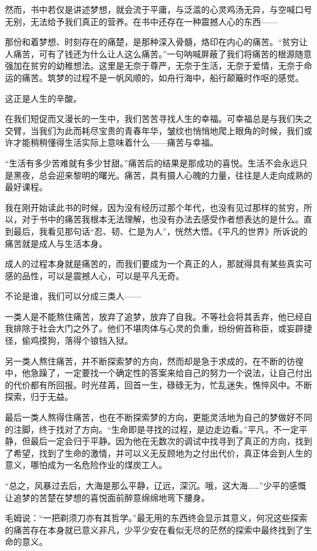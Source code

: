 \documentclass[openany,scheme = chinese, linespread = 1.5]{ctexbook}
\begin{document}
然而，书中若仅是讲述梦想，就会流于平庸，与泛滥的心灵鸡汤无异，与空喊口号无别，无法给予我们真正的营养。在书中还存在一种震撼人心的东西——    

那份和着梦想、时刻存在的痛楚，是那种深入骨髓，烙印在内心的痛苦。“贫穷让人痛苦，可有了钱还为什么让人这么痛苦。”一句呐喊屏蔽了我们将痛苦的根源随意强加在贫穷的幼稚想法。这里是无奈于尊严，无奈于生活，无奈于爱情，无奈于命运的痛苦。筑梦的过程不是一帆风顺的，如舟行海中，船行颠簸时作呕的感觉。

这正是人生的辛酸。

在我们短促而又漫长的一生中，我们苦苦寻找人生的幸福。可幸福总是与我们失之交臂，当我们为此而耗尽宝贵的青春年华，皱纹也悄悄地爬上眼角的时候，我们或许才能稍稍懂得生活实际上意味着什么——痛苦与幸福。

 “生活有多少苦难就有多少甘甜。”痛苦后的结果是那成功的喜悦。生活不会永远只是黑夜，总会迎来黎明的曙光。痛苦，具有摄人心魄的力量，往往是人走向成熟的最好课程。
 
我在刚开始读此书的时候，因为没有经历过那个年代，也没有见过那样的贫穷，所以，对于书中的痛苦我根本无法理解，也没有办法去感受作者想表达的是什么。直到最后，我看见那句话“忍、韧、仁是为人”，恍然大悟。《平凡的世界》所诉说的痛苦就是成人与生活本身。

成人的过程本身就是痛苦的，而我们要成为一个真正的人，那就得具有某些真实可感的品性，可以是震撼人心，可以是平凡无奇。

不论是谁，我们可以分成三类人——

一类人是不能熬住痛苦，放弃了追梦，放弃了自我。不等社会将其丢弃，他已经自我排除于社会大门之外了。他们不堪肉体与心灵的负重，纷纷俯首称臣，或妄辟捷径，偷鸡摸狗，落得个锒铛入狱。

另一类人熬住痛苦，并不断探索梦的方向，然而却是急于求成的，在不断的彷徨中，他急躁了，一定要找一个确定性的答案来给自己的努力一个说法，让自己付出的代价都有所回报。时光荏苒，回首一生，碌碌无为，忙乱迷失，憔悴风中。不断探索，归于无益。

最后一类人熬得住痛苦，也在不断探索梦的方向，更能灵活地为自己的梦做好不同的注脚，终于找对了方向。“生命即是寻找的过程，是边走边看。”平凡，不一定平静，但最后一定会归于平静。因为他在无数次的调试中找寻到了真正的方向，找到了希望，找到了生命的激情，并可以义无反顾地为之付出代价，真正体会到人生的意义，哪怕成为一名危险作业的煤炭工人。

“总之，风暴过去后，大海是那么平静，辽远，深沉。哦，这大海……”少平的感慨让追梦的苦楚在梦想的喜悦面前醉意绵绵地弯下腰身。

毛姆说：“一把剃须刀亦有其哲学。”最无用的东西终会显示其意义，何况这些探索的痛苦存在本身就已意义非凡，少平少安在看似无尽的茫然的探索中最终找到了生命的意义。
\end{document}
